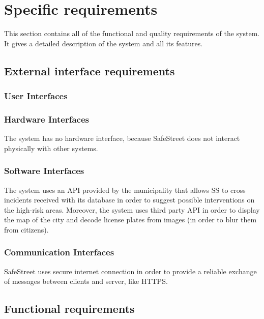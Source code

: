 \documentclass[../RASD.tex]{subfiles}
\begin{document}
    \chapter{Specific requirements}\label{ch:specific-requirements}
    This section contains all of the functional and quality requirements of the system. It gives a detailed description of the system and all its features.
        \section{External interface requirements}\label{sec:external-interface-requirements}
            \subsection{User Interfaces}\label{subsec:user-interfaces}
            \subsection{Hardware Interfaces}\label{subsec:hardware-interfaces}
        The system has no hardware interface, because SafeStreet does not interact physically with other systems.
            \subsection{Software Interfaces}\label{subsec:software-interfaces}
            The system uses an API provided by the municipality that allows SS to cross incidents received with its database in order to suggest possible interventions on the high-risk areas. Moreover, the system uses third party API in order to display the map of the city and decode license plates from images (in order to blur them from citizens).
            \subsection{Communication Interfaces}\label{subsec:communication-interface}
            SafeStreet uses secure internet connection in order to provide a reliable exchange of messages between clients and server, like HTTPS.
        \section{Functional requirements}\label{sec:functional-requirements}
\end{document}
